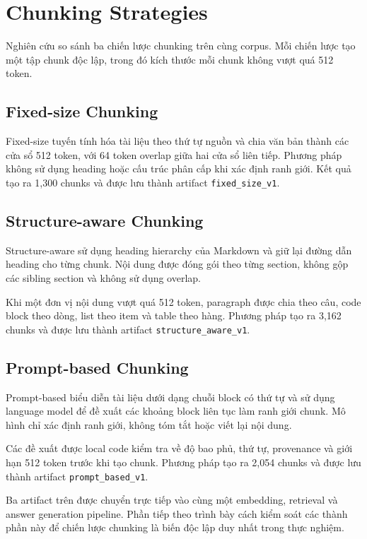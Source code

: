 
\section{Chunking Strategies}
\label{sec:chunking-strategies}

Nghiên cứu so sánh ba chiến lược chunking trên cùng corpus. Mỗi chiến lược tạo một tập chunk độc lập, trong đó kích thước mỗi chunk không vượt quá 512 token.

\subsection{Fixed-size Chunking}

Fixed-size tuyến tính hóa tài liệu theo thứ tự nguồn và chia văn bản thành các cửa sổ 512 token, với 64 token overlap giữa hai cửa sổ liên tiếp. Phương pháp không sử dụng heading hoặc cấu trúc phân cấp khi xác định ranh giới. Kết quả tạo ra 1,300 chunks và được lưu thành artifact \texttt{fixed\_size\_v1}.

\subsection{Structure-aware Chunking}

Structure-aware sử dụng heading hierarchy của Markdown và giữ lại đường dẫn heading cho từng chunk. Nội dung được đóng gói theo từng section, không gộp các sibling section và không sử dụng overlap.

Khi một đơn vị nội dung vượt quá 512 token, paragraph được chia theo câu, code block theo dòng, list theo item và table theo hàng. Phương pháp tạo ra 3,162 chunks và được lưu thành artifact \texttt{structure\_aware\_v1}.

\subsection{Prompt-based Chunking}

Prompt-based biểu diễn tài liệu dưới dạng chuỗi block có thứ tự và sử dụng language model để đề xuất các khoảng block liên tục làm ranh giới chunk. Mô hình chỉ xác định ranh giới, không tóm tắt hoặc viết lại nội dung.

Các đề xuất được local code kiểm tra về độ bao phủ, thứ tự, provenance và giới hạn 512 token trước khi tạo chunk. Phương pháp tạo ra 2,054 chunks và được lưu thành artifact \texttt{prompt\_based\_v1}.

Ba artifact trên được chuyển trực tiếp vào cùng một embedding, retrieval và answer generation pipeline. Phần tiếp theo trình bày cách kiểm soát các thành phần này để chiến lược chunking là biến độc lập duy nhất trong thực nghiệm.